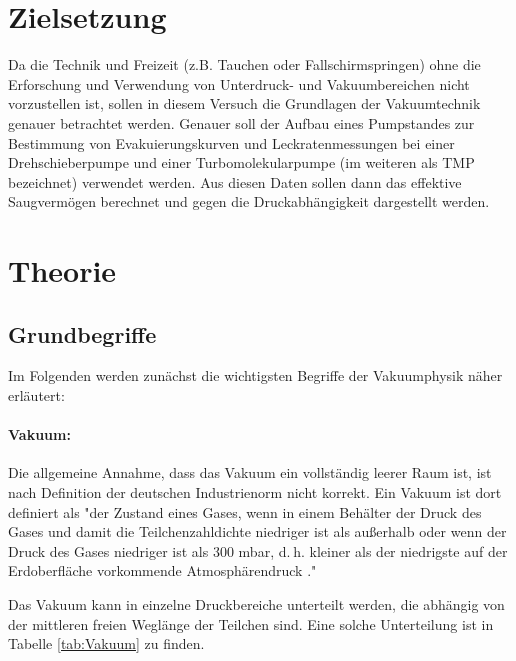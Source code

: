 \section{Zielsetzung}
\label{sec:Zielsetzung}
Da die Technik und Freizeit (z.B. Tauchen oder Fallschirmspringen) ohne die Erforschung und Verwendung von Unterdruck- und Vakuumbereichen nicht vorzustellen
ist, sollen in diesem Versuch die Grundlagen der Vakuumtechnik genauer betrachtet werden.
Genauer soll der Aufbau eines Pumpstandes zur Bestimmung von Evakuierungskurven und Leckratenmessungen
bei einer Drehschieberpumpe und einer Turbomolekularpumpe (im weiteren als TMP bezeichnet) verwendet werden.
Aus diesen Daten sollen dann das effektive Saugvermögen berechnet und gegen die Druckabhängigkeit dargestellt werden.


\section{Theorie}
\label{sec:Theorie}
\subsection{Grundbegriffe}

Im Folgenden werden zunächst die wichtigsten Begriffe der Vakuumphysik näher erläutert:
\paragraph{Vakuum:}
Die allgemeine Annahme, dass das Vakuum ein vollständig leerer Raum ist, ist nach Definition der
deutschen Industrienorm nicht korrekt.
Ein Vakuum ist dort definiert als "der Zustand eines Gases, wenn in einem Behälter der
Druck des Gases und damit die Teilchenzahldichte niedriger ist als außerhalb oder wenn der Druck
des Gases niedriger ist als 300 mbar, d. h. kleiner als der niedrigste auf der Erdoberfläche
vorkommende Atmosphärendruck \cite{vakuum}."

Das Vakuum kann in einzelne Druckbereiche unterteilt werden, die abhängig von der mittleren
freien Weglänge der Teilchen sind.
Eine solche Unterteilung ist in Tabelle \ref{tab:Vakuum} zu finden.

